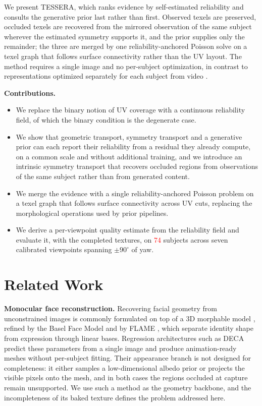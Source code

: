 \documentclass[runningheads]{llncs}
\newcommand{\PH}[1]{\textcolor{red}{#1}}
\begin{document}
We present TESSERA, which ranks evidence by self-estimated reliability and
consults the generative prior last rather than first. Observed texels are
preserved, occluded texels are recovered from the mirrored observation of the
same subject wherever the estimated symmetry supports it, and the prior
supplies only the remainder; the three are merged by one reliability-anchored
Poisson solve on a texel graph that follows surface connectivity rather than
the UV layout. The method requires a single image and no per-subject
optimization, in contrast to representations optimized separately for each
subject from video \cite{qian2024gaussianavatars}.

\medskip\noindent\textbf{Contributions.}
\begin{itemize}[leftmargin=*,nosep]
\item We replace the binary notion of UV coverage with a continuous reliability
  field, of which the binary condition is the degenerate case.
\item We show that geometric transport, symmetry transport and a generative
  prior can each report their reliability from a residual they already compute,
  on a common scale and without additional training, and we introduce an
  intrinsic symmetry transport that recovers occluded regions from observations
  of the same subject rather than from generated content.
\item We merge the evidence with a single reliability-anchored Poisson problem
  on a texel graph that follows surface connectivity across UV cuts, replacing
  the morphological operations used by prior pipelines.
\item We derive a per-viewpoint quality estimate from the reliability field and
  evaluate it, with the completed textures, on \PH{74} subjects across seven
  calibrated viewpoints spanning $\pm 90^{\circ}$ of yaw.
\end{itemize}

\section{Related Work}

\textbf{Monocular face reconstruction.} Recovering facial geometry from
unconstrained images is commonly formulated on top of a 3D morphable model
\cite{blanz1999morphable}, refined by the Basel Face Model
\cite{paysan2009bfm} and by FLAME \cite{li2017flame}, which separate identity
shape from expression through linear bases. Regression architectures such as
DECA \cite{feng2021deca} predict these parameters from a single image and
produce animation-ready meshes without per-subject fitting. Their appearance
branch is not designed for completeness: it either samples a low-dimensional
albedo prior or projects the visible pixels onto the mesh, and in both cases
the regions occluded at capture remain unsupported. We use such a method as the
geometry backbone, and the incompleteness of its baked texture defines the
problem addressed here.
\end{document}
